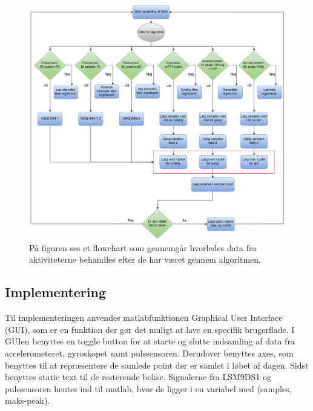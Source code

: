 \begin{figure}[H]
	\centering
	\includegraphics[scale=0.4]{figures/cDesign/pseudo_GUI.png}
	\caption{På figuren ses et flowchart som gennemgår hvorledes data fra aktiviteterne behandles efter de har været gennem algoritmen.}
	\label{fig:GUI}
\end{figure}

\subsection{Implementering}
Til implementeringen anvendes matlabfunktionen Graphical User Interface (GUI), som er en funktion der gør det muligt at lave en specifik brugerflade. I GUIen benyttes en toggle button for at starte og slutte indsamling af data fra accelerometeret, gyroskopet samt pulssensoren. Derudover benyttes axes, som benyttes til at repræsentere de samlede point der er samlet i løbet af dagen. Sidst benyttes static text til de resterende bokse. \newline
Signalerne fra LSM9DS1 og pulssensoren hentes ind til matlab, hvor de ligger i en variabel med (samples, maks-peak).